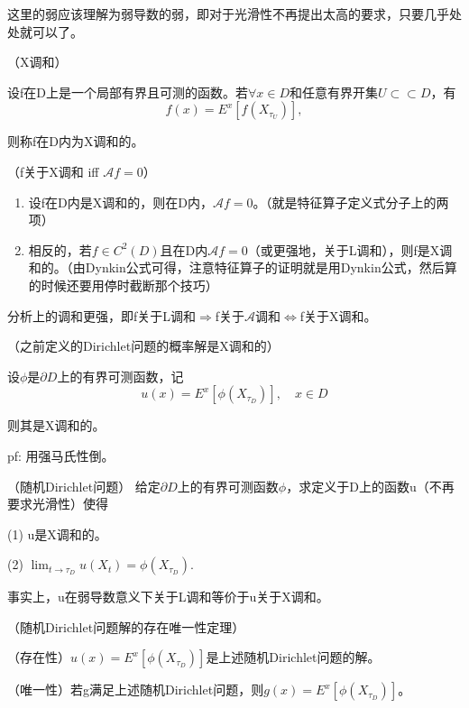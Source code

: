 这里的弱应该理解为弱导数的弱，即对于光滑性不再提出太高的要求，只要几乎处处就可以了。

\begin{df}（X调和）

  设f在D上是一个局部有界且可测的函数。若$\forall x \in D$和任意有界开集$U \subset \subset D$，有
  \[
    f(x)=E^{x}\left[f\left(X_{\tau_{U}}\right)\right],
  \]
  
  则称f在D内为X调和的。
\end{df}

\begin{lem}（f关于X调和 iff $\mathcal{A} f=0$）

  \begin{enumerate}
    \item 设f在D内是X调和的，则在D内，$\mathcal{A} f=0$。（就是特征算子定义式分子上的两项）
    \item 相反的，若$f \in C^{2}(D)$且在D内$\mathcal{A} f=0$（或更强地，关于L调和），则f是X调和的。（由Dynkin公式可得，注意特征算子的证明就是用Dynkin公式，然后算的时候还要用停时截断那个技巧）
  \end{enumerate}
\end{lem}

分析上的调和更强，即f关于L调和$\Rightarrow$f关于$\mathcal{A}$调和$\Leftrightarrow$f关于X调和。

\begin{lem}（之前定义的Dirichlet问题的概率解是X调和的）

  设$\phi$是$\partial D$上的有界可测函数，记
  \[
    u(x)=E^{x}\left[\phi\left(X_{\tau_{D}}\right)\right], \quad x \in D
  \]

  则其是X调和的。
\end{lem}

pf: 用强马氏性倒。

\begin{df}（随机Dirichlet问题）
  给定$\partial D$上的有界可测函数$\phi$，求定义于D上的函数u（不再要求光滑性）使得
  
  (1) u是X调和的。
  
  (2) $\lim_{t \rightarrow \tau_{D}} u\left(X_{t}\right)=\phi\left(X_{\tau_{D}}\right)$.
\end{df}

事实上，u在弱导数意义下关于L调和等价于u关于X调和。

\begin{thm}（随机Dirichlet问题解的存在唯一性定理）
  
  （存在性）$u(x) = E^x[\phi (X_{\tau_D})]$是上述随机Dirichlet问题的解。

  （唯一性）若g满足上述随机Dirichlet问题，则$g(x) = E^x[\phi (X_{\tau_D})]$。
\end{thm}

